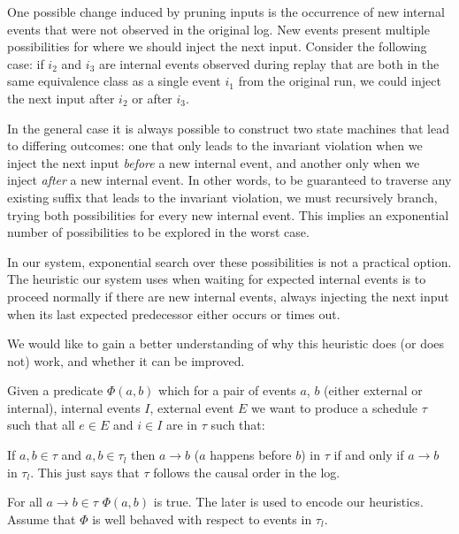 One possible change induced by pruning inputs is the occurrence of new
internal events that were not observed in the original log.
New events present multiple possibilities for where
we should inject the next input. Consider the following case:
if $i_2$ and $i_3$ are internal events observed
during replay that are both in the same equivalence class as a single event $i_1$ from the
original run, we could inject the next input after $i_2$ or after $i_3$.


In the general case it is always possible to construct two state machines that lead
to differing outcomes: one that only leads to the invariant violation when
we inject the next input
\emph{before} a new internal event, and another only when we inject \emph{after} a new internal
event. In other words, to be guaranteed to traverse any existing suffix that leads
to the invariant violation, we must recursively branch, trying both
possibilities for every new internal event. This implies an exponential number of
possibilities to be explored in the worst case.

In our system, exponential search over these possibilities is not a practical option.
The heuristic our system uses when waiting for expected internal
events is to proceed normally if there are new internal events,
always injecting the next input when its last expected predecessor
either occurs or times out.

We would like to gain a better understanding of why this heuristic does (or
does not) work, and whether it can be improved.

 Given a predicate $\Phi(a, b)$ which for a pair of events $a$, $b$ 
(either external or internal), internal events $I$, external event $E$ we want to produce a schedule $\tau$ such that all $e\in E$ and $i\in
I$ are in $\tau$ such that:

If $a, b \in \tau$ and $a, b\in \tau_l$ then $a \rightarrow b$ ($a$ happens before $b$) in $\tau$ if and only if $a
\rightarrow b$ in $\tau_l$. This just says that $\tau$ follows the causal order in the log.

For all $a\rightarrow b\in \tau$ $\Phi(a, b)$ is true. The later is used to encode our heuristics. Assume that $\Phi$ is
well behaved with respect to events in $\tau_l$.

